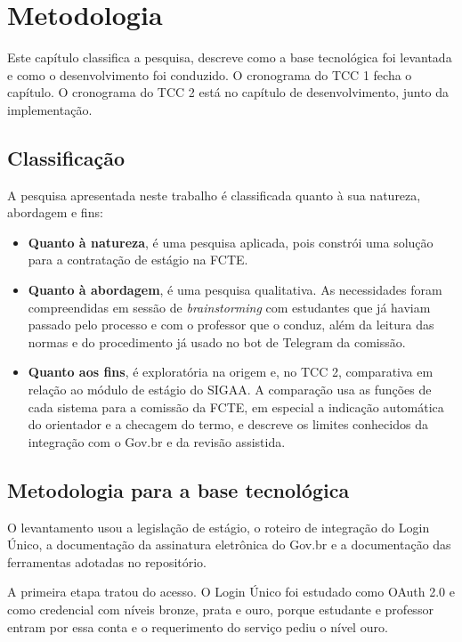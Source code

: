 \chapter{Metodologia}

Este capítulo classifica a pesquisa, descreve como a base tecnológica foi levantada e como o desenvolvimento foi conduzido. O cronograma do TCC 1 fecha o capítulo. O cronograma do TCC 2 está no capítulo de desenvolvimento, junto da implementação.

\section{Classificação}

A pesquisa apresentada neste trabalho é classificada quanto à sua natureza, abordagem e fins:

\begin{itemize}
    \item \textbf{Quanto à natureza}, é uma pesquisa aplicada, pois constrói uma solução para a contratação de estágio na FCTE.
    \item \textbf{Quanto à abordagem}, é uma pesquisa qualitativa. As necessidades foram compreendidas em sessão de \textit{brainstorming} com estudantes que já haviam passado pelo processo e com o professor que o conduz, além da leitura das normas e do procedimento já usado no bot de Telegram da comissão.
    \item \textbf{Quanto aos fins}, é exploratória na origem e, no TCC 2, comparativa em relação ao módulo de estágio do SIGAA. A comparação usa as funções de cada sistema para a comissão da FCTE, em especial a indicação automática do orientador e a checagem do termo, e descreve os limites conhecidos da integração com o Gov.br e da revisão assistida.
\end{itemize}

\section{Metodologia para a base tecnológica}

O levantamento usou a legislação de estágio, o roteiro de integração do Login Único, a documentação da assinatura eletrônica do Gov.br e a documentação das ferramentas adotadas no repositório.

A primeira etapa tratou do acesso. O Login Único foi estudado como OAuth 2.0 e como credencial com níveis bronze, prata e ouro, porque estudante e professor entram por essa conta e o requerimento do serviço pediu o nível ouro.

